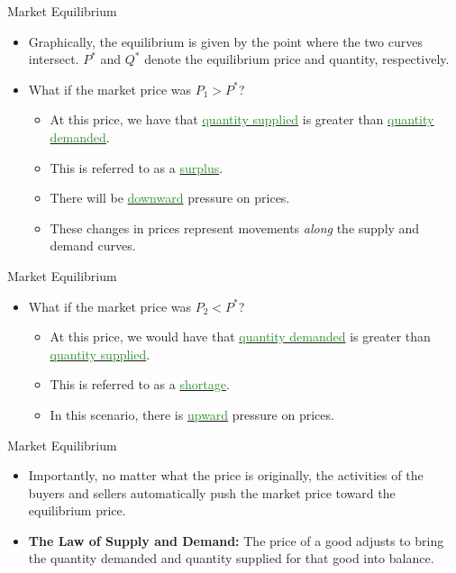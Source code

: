 \documentclass[xcolor={dvipsnames},pdf, hyperref={colorlinks=true, citecolor=ForestGreen, linkcolor=BlueViolet, urlcolor=Magenta}]{beamer}
\theoremstyle{definition}
\newcommand{\defn}[1]{\textbf{#1}}
\newcommand{\dd}[1]{{\underline{\textcolor{ForestGreen}{#1}}}}
\begin{document}
\begin{frame}{Market Equilibrium}
	\begin{itemize}
		\item	Graphically, the equilibrium is given by the point where the two curves intersect. $P^*$ and $Q^*$ denote the equilibrium price and quantity, respectively.
		\item 	What if the market price was $P_1>P^*$? 
		\begin{itemize}
			\item At this price, we  have that \dd{quantity supplied} is greater than \dd{quantity demanded}. 
			\item This is referred to as a \dd{surplus}. 
			\item There will be \dd{downward} pressure on prices. \item These changes in prices represent movements \textit{along} the supply and demand curves.
		\end{itemize}	
		
	\end{itemize}
\end{frame}

\begin{frame}{Market Equilibrium}
\begin{itemize}
\item What if the market price was $P_2<P^*$? 
\begin{itemize}
	\item At this price, we would have that \dd{quantity demanded} is greater than \dd{quantity supplied}.
	\item This is referred to as a \dd{shortage}. 
	\item  In this scenario, there is \dd{upward} pressure on prices. 
\end{itemize}
\end{itemize}
\end{frame}

\begin{frame}{Market Equilibrium}
	\begin{itemize}
		\item 	Importantly, no matter what the price is originally, the activities of the buyers and sellers automatically push the market price toward the equilibrium price.
		\item \defn{The Law of Supply and Demand:} The price of a good adjusts to bring the quantity demanded and quantity supplied for that good into balance. 
	\end{itemize}
\end{frame}
\end{document}
